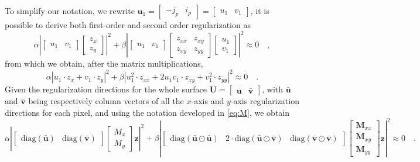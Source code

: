 To simplify our notation, we rewrite $\mathbf{u}_1 = \begin{bmatrix} -j_p & i_p \end{bmatrix} = \begin{bmatrix} u_1 & v_1\end{bmatrix}$, it is possible to derive both first-order and second order regularization as
\begin{equation}
\alpha \left\lvert \begin{bmatrix} u_1 & v_1 \end{bmatrix} \begin{bmatrix} z_x \\ z_y \end{bmatrix} \right\rvert ^2 + 
\beta \left\lvert \begin{bmatrix} u_1 & v_1 \end{bmatrix} \begin{bmatrix} z_{xx} & z_{xy} \\ z_{xy} & z_{yy} \end{bmatrix} \begin{bmatrix} u_1 \\ v_1 \end{bmatrix} \right\rvert ^2 \approx 0
\quad,
\end{equation}
from which we obtain, after the matrix multiplications, 
\begin{equation}
\alpha \left\lvert u_1\cdot{}z_x + v_1\cdot{}z_y  \right\rvert ^2 + 
\beta \left\lvert  u_1^2\cdot{}z_{xx} + 2u_1v_1\cdot{}z_{xy} + v_1^2\cdot{}z_{yy} \right\rvert ^2
\approx 0
\quad.
\end{equation}
Given the regularization directions for the whole surface $\mathbf{U} = \begin{bmatrix}\bar{\mathbf{u}} & \bar{\mathbf{v}} \end{bmatrix}$, with $\bar{\mathbf{u}}$ and $\bar{\mathbf{v}}$ being respectively column vectors of all the $x$-axis and $y$-axis regularization directions for each pixel, and using the notation developed in \eqref{eq:M}, we obtain
\begin{equation}
\alpha \left\lvert
\begin{bmatrix} \mathrm{diag}(\bar{\mathbf{u}}) & \mathrm{diag}(\bar{\mathbf{v}}) \end{bmatrix}
\begin{bmatrix}
M_x \\
M_y
\end{bmatrix}
\mathbf{z}
\right\rvert ^2 + 
\beta \left\lvert
\begin{bmatrix} \mathrm{diag}(\bar{\mathbf{u}} \odot \bar{\mathbf{u}}) &  2\cdot{}\mathrm{diag}(\bar{\mathbf{u}} \odot \bar{\mathbf{v}}) & \mathrm{diag}(\bar{\mathbf{v}} \odot \bar{\mathbf{v}})
\end{bmatrix}
\begin{bmatrix} \mathbf{M}_{xx} \\ \mathbf{M}_{xy} \\ \mathbf{M}_{yy} \end{bmatrix}
\mathbf{z}
\right\rvert ^2
\approx 0
\quad.
\end{equation}
